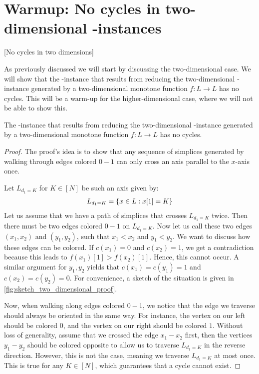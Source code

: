 \section{Warmup: No cycles in two-dimensional \Tarskistar-instances}[No cycles in two dimensions]

As previously discussed we will start by discussing the two-dimensional case. We will show that the \EndOfLine-instance that results from reducing the two-dimensional \Sperner-instance generated by a two-dimensional monotone function $f : L \rightarrow L$ has no cycles. This will be a warm-up for the higher-dimensional case, where we will not be able to show this.

\begin{proposition}
	The \EndOfLine-instance that results from reducing the two-dimensional \Sperner-instance generated by a two-dimensional monotone function $f : L \rightarrow L$ has no cycles.
\end{proposition}
\begin{proof}
	The proof's idea is to show that any sequence of simplices generated by walking through edges colored $0 - 1$ can only cross an axis parallel to the $x$-axis once.

	Let $L_{d_1= K}$ for $K \in [N]$ be such an axis given by:
	\begin{align*}
		L_{d_1=K} = \left\{x \in L : x[1] = K\right\}
	\end{align*}
	Let us assume that we have a path of simplices that crosses $L_{d_1 = K}$ twice. Then there must be two edges colored $0 - 1$ on $L_{d_1=K}$. Now let us call these two edges $(x_1, x_2)$ and $(y_1, y_2)$, such that $x_1 < x_2$ and $y_1 < y_2$. We want to discuss how these edges can be colored. If $c(x_1) = 0$ and $c(x_2) = 1$, we get a contradiction because this leads to $f(x_1)[1] > f(x_2)[1]$. Hence, this cannot occur. A similar argument for $y_1, y_2$ yields that $c(x_1) = c(y_1) =1$ and $c(x_2) = c(y_2) = 0$. For convenience, a sketch of the situation is given in \cref{fig:sketch_two_dimensional_proof}.

	Now, when walking along edges colored $0 - 1$, we notice that the edge we traverse should always be oriented in the same way. For instance, the vertex on our left should be colored $0$, and the vertex on our right should be colored $1$. Without loss of generality, assume that we crossed the edge $x_1 - x_2$ first, then the vertices $y_1 - y_2$ should be colored opposite to allow us to traverse $L_{d_1=K}$ in the reverse direction. However,  this is not the case, meaning we traverse $L_{d_1=K}$ at most once. This is true for any $K \in [N]$, which guarantees that a cycle cannot exist.
\end{proof}
\begin{marginfigure}[-30mm]
	\caption{Sketch of the setting for the two-dimensional proof}\label{fig:sketch_two_dimensional_proof}
\end{marginfigure}

